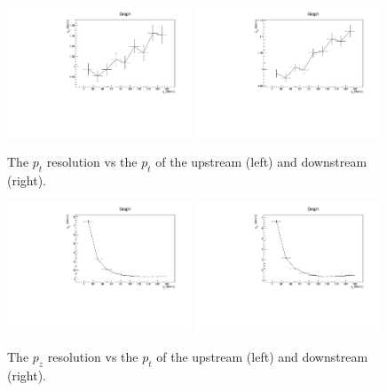   \begin{figure}[p]
   \begin{center}
     \includegraphics[width=0.49\textwidth, angle=0]{08-Performance/upstream_pt_resolution_vs_pt.pdf}
     \includegraphics[width=0.49\textwidth, angle=0]{08-Performance/downstream_pt_resolution_vs_pt.pdf}
     \caption{\label{fig:PtPtResolKalman} The $p_t$ resolution vs the $p_t$ of the upstream (left) and downstream (right).}
   \end{center}
  \end{figure}
  
  \begin{figure}[p]
   \begin{center}
     \includegraphics[width=0.49\textwidth, angle=0]{08-Performance/upstream_pz_resolution_vs_pt.pdf}
     \includegraphics[width=0.49\textwidth, angle=0]{08-Performance/downstream_pz_resolution_vs_pt.pdf}
     \caption{\label{fig:PtPzResolKalman} The $p_z$ resolution vs the $p_t$ of the upstream (left) and downstream (right).}
   \end{center}
  \end{figure}